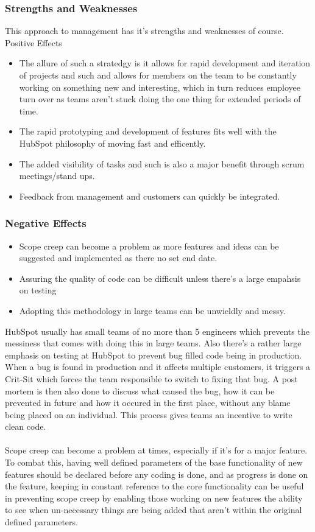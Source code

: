 \documentclass[12pt]{article} %
\begin{document}
\subsubsection{\textbf {Strengths and Weaknesses}}
This approach to management has it's strengths and weaknesses of course.
\\
Positive Effects \begin{itemize} 
\item The allure of such a stratedgy is it allows for rapid development and iteration of projects and such and allows for members on the team to be constantly working on something new and interesting, which in turn reduces employee turn over as teams aren't stuck doing the one thing for extended periods of time. 
\item The rapid prototyping and development of features fits well with the HubSpot philosophy of moving fast and efficently. 
\item The added visibility of tasks and such is also a major benefit through scrum meetings/stand ups. 
\item Feedback from management and customers can quickly be integrated.
\end{itemize}  

\subsubsection{\textbf{Negative Effects}}
 \begin{itemize}
 \item Scope creep can become a problem as more features and ideas can be suggested and implemented as there no set end date.
 \item Assuring the quality of code can be difficult unless there's a large empahsis on testing
 \item Adopting this methodology in large teams can be unwieldly and messy.
\end{itemize}
HubSpot usually has small teams of no more than 5 engineers which prevents the messiness that comes with doing this in large teams. Also there's a rather large emphasis on testing at HubSpot to prevent bug filled code being in production. When a bug is found in production and it affects multiple customers, it triggers a Crit-Sit which forces the team responsible to switch to fixing that bug. A post mortem is then also done to discuss what caused the bug, how it can be prevented in future and how it occured in the first place, without any blame being placed on an individual. This process gives teams an incentive to write clean code. \\\\Scope creep can become a problem at times, especially if it's for a major feature. To combat this, having well defined parameters of the base functionality of new features should be declared before any coding is done, and as progress is done on the feature, keeping in constant reference to the core functionality can be useful in preventing scope creep by enabling those working on new features the ability to see when un-necessary things are being added that aren't within the original defined parameters.
\end{document}
